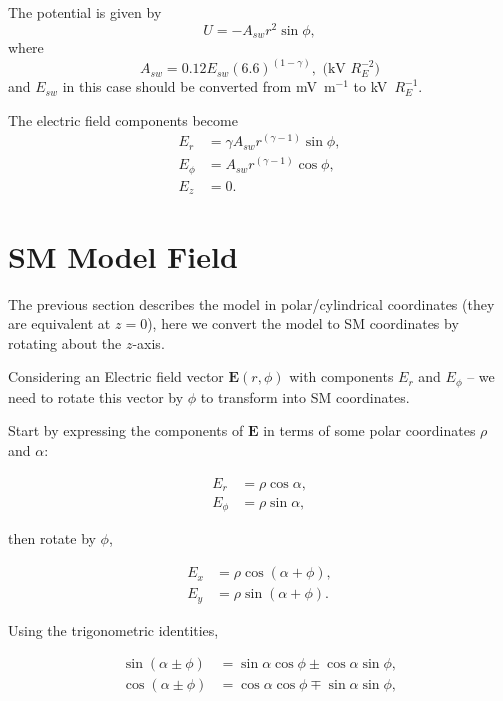\documentclass[]{article}
\begin{document}
The potential is given by 
\begin{equation}
	U = -A_{sw} r^2 \sin{\phi},
\end{equation}
where 
\begin{equation}
	A_{sw} = 0.12 E_{sw} (6.6)^{(1-\gamma)}, \text{ (kV $R_E^{-2}$)}
\end{equation}
and $E_{sw}$ in this case should be converted from mV~m$^{-1}$ to kV~$R_E^{-1}$.

The electric field components become
\begin{align}
E_r &= \gamma A_{sw} r^{(\gamma-1)}\sin{\phi},\\
E_\phi &= A_{sw} r^{(\gamma-1)} \cos{\phi},\\
E_z &= 0.
\end{align}


\section{SM Model Field}

	The previous section describes the model in polar/cylindrical coordinates (they are equivalent at $z=0$), here we convert the model to SM coordinates by rotating about the $z$-axis.
	
	Considering an Electric field vector $\mathbf{E}(r,\phi)$ with components $E_r$ and $E_\phi$ -- we need to rotate this vector by $\phi$ to transform into SM coordinates.
	
	Start by expressing the components of $\mathbf{E}$ in terms of some polar coordinates $\rho$ and $\alpha$:
	
	\begin{align}
		E_r &= \rho \cos{\alpha}, \label{EqEr}\\
		E_\phi &= \rho \sin{\alpha}, \label{EqEp}
	\end{align}
	
	then rotate by $\phi$,
	
	\begin{align}
		E_x &= \rho \cos{(\alpha + \phi)}, \label{EqEx0}\\
		E_y &= \rho \sin{(\alpha + \phi)}. \label{EqEy0}		
	\end{align}
	
	Using the trigonometric identities,
	
	\begin{align}
		\sin{(\alpha \pm \phi)} &= \sin\alpha\cos\phi \pm \cos\alpha\sin\phi, \\
		\cos{(\alpha \pm \phi)} &= \cos\alpha\cos\phi \mp \sin\alpha\sin\phi,
	\end{align}
	
\end{document}
